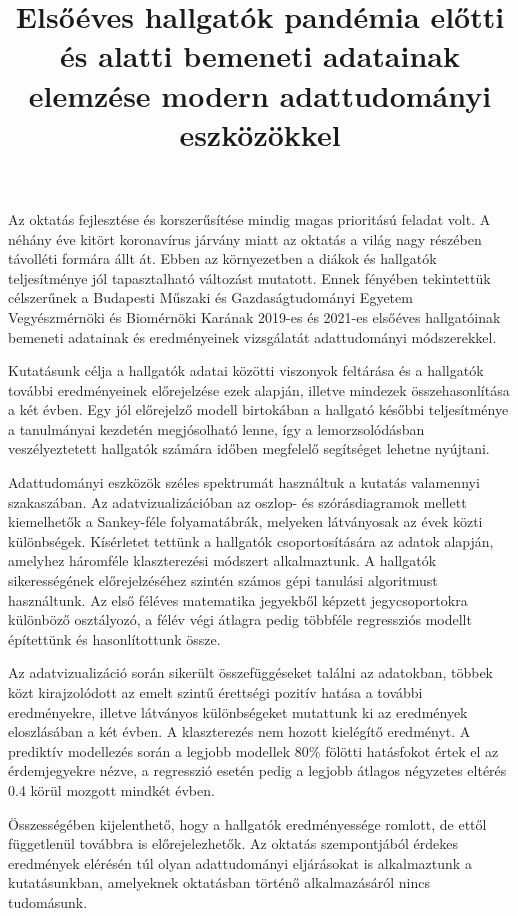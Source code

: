 \documentclass[12pt]{article}
\title{Elsőéves hallgatók pandémia előtti és alatti bemeneti adatainak elemzése modern adattudományi eszközökkel}
\begin{document}
\maketitle



Az oktatás fejlesztése és korszerűsítése mindig magas prioritású feladat volt. A néhány éve kitört koronavírus járvány miatt az oktatás a világ nagy részében távolléti formára állt át. Ebben az környezetben a diákok és hallgatók teljesítménye jól tapasztalható változást mutatott. Ennek fényében tekintettük célszerűnek a Budapesti Műszaki és Gazdaságtudományi Egyetem Vegyészmérnöki és Biomérnöki Karának 2019-es és 2021-es elsőéves hallgatóinak bemeneti adatainak és eredményeinek vizsgálatát adattudományi módszerekkel.

Kutatásunk célja a hallgatók adatai közötti viszonyok feltárása és a hallgatók további eredményeinek előrejelzése ezek alapján, illetve mindezek összehasonlítása a két évben. Egy jól előrejelző modell birtokában a hallgató későbbi teljesítménye a tanulmányai kezdetén megjósolható lenne, így a lemorzsolódásban veszélyeztetett hallgatók számára időben megfelelő segítséget lehetne  nyújtani.

Adattudományi eszközök széles spektrumát használtuk a kutatás valamennyi szakaszában. Az adatvizualizációban az oszlop- és szórásdiagramok mellett kiemelhetők a Sankey-féle folyamatábrák, melyeken látványosak az évek közti különbségek. Kísérletet tettünk a hallgatók csoportosítására az adatok alapján, amelyhez háromféle klaszterezési módszert alkalmaztunk. A hallgatók sikerességének előrejelzéséhez szintén számos gépi tanulási algoritmust használtunk. Az első féléves matematika jegyekből képzett jegycsoportokra különböző osztályozó, a félév végi átlagra pedig többféle regressziós modellt építettünk és hasonlítottunk össze.

Az adatvizualizáció során sikerült összefüggéseket találni az adatokban, többek közt kirajzolódott az emelt szintű érettségi pozitív hatása a további eredményekre, illetve látványos különbségeket mutattunk ki az eredmények eloszlásában a két évben. A klaszterezés nem hozott kielégítő eredményt. A prediktív modellezés során a legjobb modellek 80\% fölötti hatásfokot értek el az érdemjegyekre nézve, a regresszió esetén pedig a legjobb átlagos négyzetes eltérés 0.4 körül mozgott mindkét évben.

Összességében kijelenthető, hogy a hallgatók eredményessége romlott, de ettől függetlenül továbbra is előrejelezhetők. Az oktatás szempontjából érdekes eredmények elérésén túl olyan adattudományi eljárásokat is alkalmaztunk a kutatásunkban, amelyeknek oktatásban történő alkalmazásáról nincs tudomásunk. 
\end{document}
